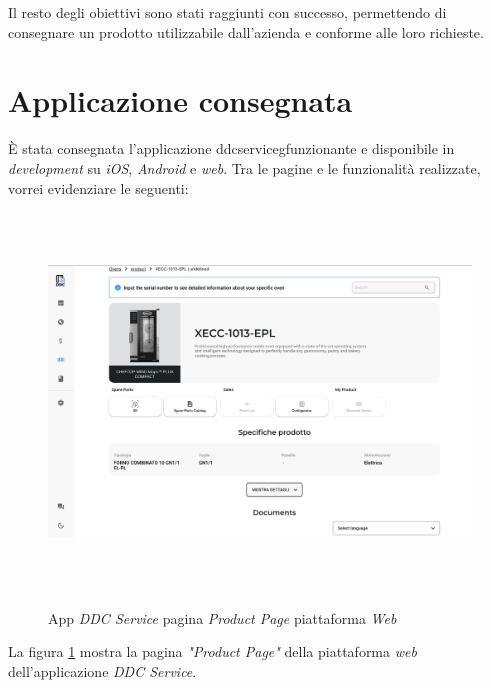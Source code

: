 Il resto degli obiettivi sono stati raggiunti con successo, permettendo di consegnare un prodotto utilizzabile dall'azienda e conforme alle loro richieste.

\section{Applicazione consegnata}

È stata consegnata l'applicazione \gls{ddcserviceg}\glox funzionante e disponibile in \textit{development} su \textit{iOS}, \textit{Android} e \textit{web}.
Tra le pagine e le funzionalità realizzate, vorrei evidenziare le seguenti:

\begin{figure}[H]
    \centering
    \includegraphics[alt={Screenshot della pagina \textit{"Product Page"} su piattaforma \textit{web}}, height=10cm]{img/ProductPageWeb}
    \caption{App \textit{DDC Service} pagina \textit{Product Page} piattaforma \textit{Web}}
    \label{fig:productpageweb}
\end{figure}

La figura \ref{fig:productpageweb} mostra la pagina \textit{"Product Page"} della piattaforma \textit{web} dell'applicazione \textit{DDC Service}.

